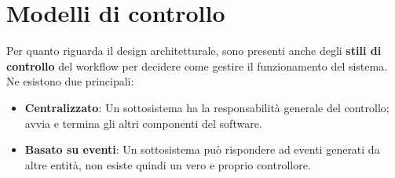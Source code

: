 %

\section{Modelli di controllo}
Per quanto riguarda il design architetturale, sono presenti anche degli \textbf{stili di controllo} del workflow per decidere come gestire il funzionamento del sistema. Ne esistono due principali: \begin{itemize}
	\item \textbf{Centralizzato}: Un sottosistema ha la responsabilità generale del controllo; avvia e termina gli altri componenti del software.
	\item \textbf{Basato su eventi}: Un sottosistema può rispondere ad eventi generati da altre entità, non esiste quindi un vero e proprio controllore.
\end{itemize}

